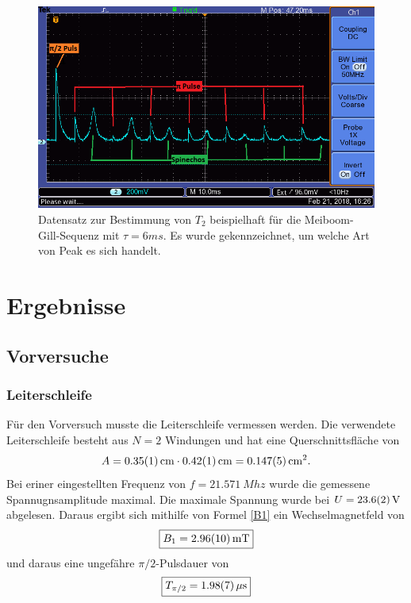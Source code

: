 \documentclass[12pt,a4paper]{article}
\begin{document}
\begin{figure}
\centering
\includegraphics[scale=0.8]{Bilder/T2Beispiel.png}
\caption{Datensatz zur Bestimmung von $T_2$ beispielhaft für die Meiboom-Gill-Sequenz mit $\tau = 6ms$. Es wurde gekennzeichnet, um welche Art von Peak es sich handelt. }
\label{fig:T2Beispiel}
\end{figure}

\newpage
\section{Ergebnisse}

\subsection{Vorversuche}

\subsubsection{Leiterschleife}

Für den Vorversuch musste die Leiterschleife vermessen werden. Die verwendete Leiterschleife besteht aus $N=2$ Windungen und hat eine Querschnittsfläche von 
\begin{equation*}
A =  \SI{0.35\pm 0.01}{cm} \cdot \SI{0.42\pm 0.01}{cm} = \SI{0.147\pm 0.005}{cm^2}.
\end{equation*}
Bei eriner eingestellten Frequenz von $f = \SI{21.571}{Mhz}$ wurde die gemessene Spannugnsamplitude maximal. Die maximale Spannung wurde bei $U =\SI{23.6\pm 0.2}{V}$ abgelesen. Daraus ergibt sich mithilfe von Formel \ref{B1} ein Wechselmagnetfeld von 
\begin{equation*}
\boxed{B_1 = \SI{2.96\pm 0.10}{mT}}
\end{equation*}
und daraus eine ungefähre $\pi /2$-Pulsdauer von
\begin{equation*}
\boxed{T_{\pi /2} = \SI{1.98\pm 0.07}{\mu s}}
\end{equation*}
\end{document}
